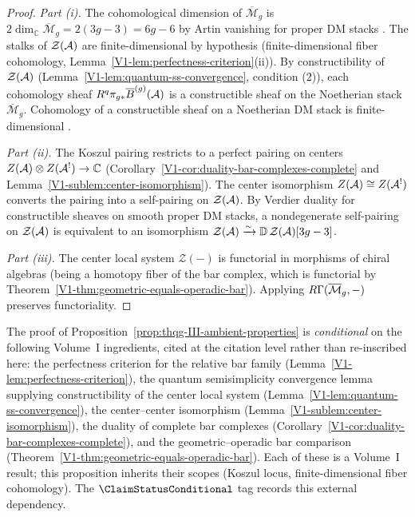 \begin{proof}
\emph{Part (i).}
The cohomological dimension of $\overline{\mathcal{M}}_g$ is
$2 \dim_{\mathbb{C}} \overline{\mathcal{M}}_g = 2(3g - 3) = 6g - 6$
by Artin vanishing for proper DM stacks
\cite[\S4.1]{Olsson16}. The stalks of
$\mathcal{Z}(\mathcal{A})$ are finite-dimensional by hypothesis
(finite-dimensional fiber cohomology,
Lemma~\ref{V1-lem:perfectness-criterion}(ii)).
By constructibility of $\mathcal{Z}(\mathcal{A})$
(Lemma~\ref{V1-lem:quantum-ss-convergence}, condition (2)),
each cohomology sheaf $R^q\pi_{g*}\overline{B}^{(g)}(\mathcal{A})$
is a constructible sheaf on the Noetherian stack
$\overline{\mathcal{M}}_g$. Cohomology of a constructible
sheaf on a Noetherian DM stack is finite-dimensional
\cite[Theorem~18.1.1]{SAG}.

\emph{Part (ii).}
The Koszul pairing restricts to a perfect pairing on centers
$Z(\mathcal{A}) \otimes Z(\mathcal{A}^!) \to \mathbb{C}$
(Corollary~\ref{V1-cor:duality-bar-complexes-complete} and
Lemma~\ref{V1-sublem:center-isomorphism}).
The center isomorphism $Z(\mathcal{A}) \cong Z(\mathcal{A}^!)$ converts the
pairing into a self-pairing on $\mathcal{Z}(\mathcal{A})$.
By Verdier duality for constructible sheaves on smooth proper
DM stacks, a nondegenerate self-pairing on $\mathcal{Z}(\mathcal{A})$
is equivalent to an isomorphism
$\mathcal{Z}(\mathcal{A}) \xrightarrow{\sim}
\mathbb{D}\,\mathcal{Z}(\mathcal{A})[3g - 3]$.

\emph{Part (iii).}
The center local system $\mathcal{Z}(-)$ is functorial in
morphisms of chiral algebras (being a homotopy fiber of the
bar complex, which is functorial by
Theorem~\ref{V1-thm:geometric-equals-operadic-bar}).
Applying $R\Gamma(\overline{\mathcal{M}}_g, -)$ preserves
functoriality.
\end{proof}

\begin{remark}
\label{rem:thqg-III-ambient-properties-attribution}
The proof of
Proposition~\ref{prop:thqg-III-ambient-properties} is
\emph{conditional} on the following Volume~I ingredients, cited at
the citation level rather than re-inscribed here: the perfectness
criterion for the relative bar family
(Lemma~\ref{V1-lem:perfectness-criterion}), the quantum
semisimplicity convergence lemma supplying constructibility of the
center local system
(Lemma~\ref{V1-lem:quantum-ss-convergence}), the center--center
isomorphism
(Lemma~\ref{V1-sublem:center-isomorphism}), the duality of
complete bar complexes
(Corollary~\ref{V1-cor:duality-bar-complexes-complete}), and the
geometric--operadic bar comparison
(Theorem~\ref{V1-thm:geometric-equals-operadic-bar}). Each of
these is a Volume~I result; this proposition inherits their
scopes (Koszul locus, finite-dimensional fiber cohomology). The
$\ClaimStatusConditional$ tag records this external dependency.
\end{remark}

